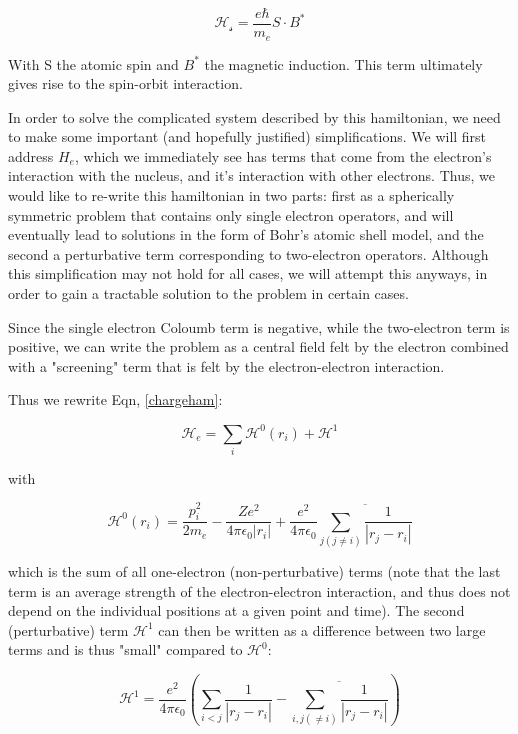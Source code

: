 \begin{equation}
\mathscr{H_s}=\frac{e\hbar}{m_e}S\cdot B^*
\label{spinham}
\end{equation}

With S the atomic spin and $B^*$ the magnetic induction. This term ultimately gives rise to the spin-orbit interaction.

In order to solve the complicated system described by this hamiltonian, we need to make some important (and hopefully justified) simplifications. We will first address $H_e$, which we immediately see has terms that come from the electron's interaction with the nucleus, and it's interaction with other electrons. Thus, we would like to re-write this hamiltonian in two parts: first as a spherically symmetric problem that contains only single electron operators, and will eventually lead to solutions in the form of Bohr's atomic shell model, and the second a perturbative term corresponding to two-electron operators. Although this simplification may not hold for all cases, we will attempt this anyways, in order to gain a tractable solution to the problem in certain cases.

Since the single electron Coloumb term is negative, while the two-electron term is positive, we can write the problem as a central field felt by the electron combined with a "screening" term that is felt by the electron-electron interaction.

Thus we rewrite Eqn, \ref{chargeham}:
 
\begin{equation}
\mathscr{H}_e = \sum_i\mathscr{H}^0\left(r_i\right)+\mathscr{H}^1
\end{equation}	

with

\begin{equation}
\mathscr{H}^0\left(r_i\right) = \frac{p_i^2}{2m_e} - \frac{Ze^2}{4\pi\epsilon_0|r_i|}+\frac{e^2}{4\pi\epsilon_0}\overline{\sum_{j(j\neq i)}\frac{1}{|r_j-r_i|}}
\end{equation}

which is the sum of all one-electron (non-perturbative) terms (note that the last term is an average strength of the electron-electron interaction, and thus does not depend on the individual positions at a given point and time). The second (perturbative) term $\mathscr{H}^1$ can then be written as a difference between two large terms and is thus "small" compared to $\mathscr{H}^0$:

\begin{equation}
\mathscr{H}^1=\frac{e^2}{4\pi\epsilon_0}\left(\sum_{i<j}\frac{1}{|r_j-r_i|}-\overline{\sum_{i,j(\neq i)}\frac{1}{|r_j-r_i|}}\right)
\end{equation}

